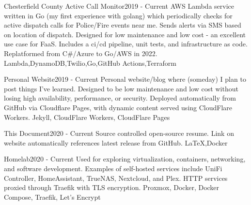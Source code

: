 \begin{projects}
    \project
    {Chesterfield County Active Call Monitor}{2019 - Current}
    {}
    {AWS Lambda service written in Go (my first experience with golang) which periodically checks for active dispatch calls for Police/Fire events near me. Sends alerts via SMS based on location of dispatch. Designed for low maintenance and low cost - an excellent use case for FaaS. Includes a ci/cd pipeline, unit tests, and infrastructure as code. Replatformed from C\#/Azure to Go/AWS in 2022.}
    {Lambda,DynamoDB,Twilio,Go,GitHub Actions,Terraform}

    \ifcv
    \project
    {Personal Website}{2019 - Current}
    {}
    {Personal website/blog where (someday) I plan to post things I've learned. Designed to be low maintenance and low cost without losing high availability, performance, or security. Deployed automatically from GitHub via Cloudflare Pages, with dynamic content served using CloudFlare Workers.}
    {Jekyll, CloudFlare Workers, CloudFlare Pages}
    \fi

    \project
    {This Document}{2020 - Current}
    {\thislink{\website}}
    {Source controlled open-source resume. Link on website automatically references latest release from GitHub.}%
    {\LaTeX,Docker}

    \ifcv
    \project
    {Homelab}{2020 - Current}
    {}
    {Used for exploring virtualization, containers, networking, and software development. Examples of self-hosted services include UniFi Controller, HomeAssistant, TrueNAS, Nextcloud, and Plex. HTTP services proxied through Traefik with TLS encryption.}
    {Proxmox, Docker, Docker Compose, Traefik, Let's Encrypt}
    \fi
\end{projects}
